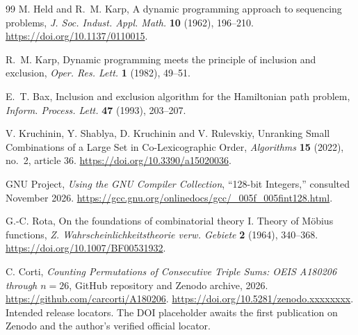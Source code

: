 \documentclass[11pt]{article}
\begin{document}
\begin{thebibliography}{99}
M. Held and R.~M. Karp, A dynamic programming approach to sequencing
problems, \emph{J. Soc. Indust. Appl. Math.} \textbf{10} (1962), 196--210.
\url{https://doi.org/10.1137/0110015}.

R.~M. Karp, Dynamic programming meets the principle of inclusion and
exclusion, \emph{Oper. Res. Lett.} \textbf{1} (1982), 49--51.

E.~T. Bax, Inclusion and exclusion algorithm for the Hamiltonian path
problem, \emph{Inform. Process. Lett.} \textbf{47} (1993), 203--207.

V. Kruchinin, Y. Shablya, D. Kruchinin and V. Rulevskiy,
Unranking Small Combinations of a Large Set in Co-Lexicographic Order,
\emph{Algorithms} \textbf{15} (2022), no.~2, article 36.
\url{https://doi.org/10.3390/a15020036}.

GNU Project, \emph{Using the GNU Compiler Collection}, ``128-bit Integers,''
consulted November 2026.
\url{https://gcc.gnu.org/onlinedocs/gcc/_005f_005fint128.html}.

G.-C. Rota, On the foundations of combinatorial theory I. Theory of
M\"obius functions, \emph{Z. Wahrscheinlichkeitstheorie verw. Gebiete}
\textbf{2} (1964), 340--368.
\url{https://doi.org/10.1007/BF00531932}.

C. Corti, \emph{Counting Permutations of Consecutive Triple Sums:
OEIS A180206 through \(n=26\)}, GitHub repository and Zenodo archive, 2026.
\url{https://github.com/carcorti/A180206}.
\url{https://doi.org/10.5281/zenodo.xxxxxxxx}.
Intended release locators. The DOI placeholder awaits the first publication
on Zenodo and the author's verified official locator.
\end{thebibliography}
\end{document}
